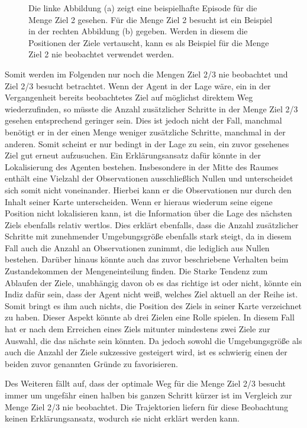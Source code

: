 \begin{figure}[ht!]
\begin{subfigure}[c]{0.5\textwidth}
		\subcaption{}
		\label{sample_visited}
	\end{subfigure}
	\caption{Die linke Abbildung (a) zeigt eine beispielhafte Episode für die Menge \glqq Ziel 2 gesehen\grqq{}. Für die Menge \glqq Ziel 2 besucht\grqq{} ist ein Beispiel in der rechten Abbildung (b) gegeben. Werden in diesem die Positionen der Ziele vertauscht, kann es als Beispiel für die Menge \glqq Ziel 2 nie beobachtet\grqq{} verwendet werden.}
\end{figure}

Somit werden im Folgenden nur noch die Mengen \glqq Ziel 2/3 nie beobachtet\grqq{} und \glqq Ziel 2/3 besucht\grqq{} betrachtet. Wenn der Agent in der Lage wäre, ein in der Vergangenheit bereits beobachtetes Ziel auf möglichst direktem Weg wiederzufinden, so müsste die Anzahl zusätzlicher Schritte in der Menge \glqq Ziel 2/3 gesehen\grqq{} entsprechend geringer sein. Dies ist jedoch nicht der Fall, manchmal benötigt er in der einen Menge weniger zusätzliche Schritte, manchmal in der anderen. Somit scheint er nur bedingt in der Lage zu sein, ein zuvor gesehenes Ziel gut erneut aufzusuchen. Ein Erklärungsansatz dafür könnte in der Lokalisierung des Agenten bestehen. Insbesondere in der Mitte des Raumes enthält eine Vielzahl der Observationen ausschließlich Nullen und unterscheidet sich somit nicht voneinander. Hierbei kann er die Observationen nur durch den Inhalt seiner Karte unterscheiden. Wenn er hieraus wiederum seine eigene Position nicht lokalisieren kann, ist die Information über die Lage des nächsten Ziels ebenfalls relativ wertlos. Dies erklärt ebenfalls, dass die Anzahl zusätzlicher Schritte mit zunehmender Umgebungsgröße ebenfalls stark steigt, da in diesem Fall auch die Anzahl an Observationen zunimmt, die lediglich aus Nullen bestehen. Darüber hinaus könnte auch das zuvor beschriebene Verhalten beim Zustandekommen der Mengeneinteilung finden. Die Starke Tendenz zum Ablaufen der Ziele, unabhängig davon ob es das richtige ist oder nicht, könnte ein Indiz dafür sein, dass der Agent nicht weiß, welches Ziel aktuell an der Reihe ist. Somit bringt es ihm auch nichts, die Position des Ziels in seiner Karte verzeichnet zu haben. Dieser Aspekt könnte ab drei Zielen eine Rolle spielen. In diesem Fall hat er nach dem Erreichen eines Ziels mitunter mindestens zwei Ziele zur Auswahl, die das nächste sein könnten. Da jedoch sowohl die Umgebungsgröße als auch die Anzahl der Ziele sukzessive gesteigert wird, ist es schwierig einen der beiden zuvor genannten Gründe zu favorisieren.

Des Weiteren fällt auf, dass der optimale Weg für die Menge \glqq Ziel 2/3 besucht\grqq{} immer um ungefähr einen halben bis ganzen Schritt kürzer ist im Vergleich zur Menge \glqq Ziel 2/3 nie beobachtet\grqq{}. Die Trajektorien liefern für diese Beobachtung keinen Erklärungsansatz, wodurch sie nicht erklärt werden kann.

